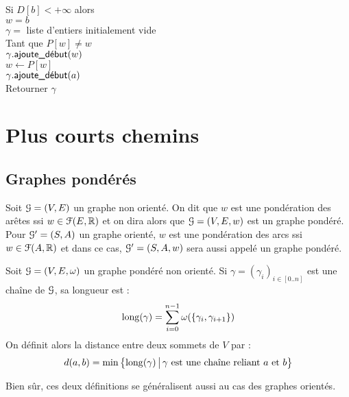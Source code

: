 			\begin{algocont}
				Si \(D[b] < +\infty\) alors \\ \Indp
					\(w = b\) \\
					\(\gamma = \) liste d'entiers initialement vide \\
					Tant que \(P[w] \neq w\)  \\ \Indp
						\(\gamma.\text{\textsf{ajoute\_début}}(w)\) \\
						\(w \gets P[w]\) \\ \Indm
					\(\gamma.\text{\textsf{ajoute\_début}}(a)\) \\ \Indm
				Retourner \(\gamma\)
			\end{algocont}
			

\section{Plus courts chemins}
	
	\subsection{Graphes pondérés}
	
		\begin{Definition}[pondération]
			Soit \(\EuScript{G} = (V,E)\) un graphe non orienté. On dit que \(w\) est une pondération des arêtes ssi \(w \in \EuScript{F}(E,\mathbb{R})\) et on dira alors que \(\EuScript{G} = (V,E,w)\) est un graphe pondéré. \nt
			Pour \(\EuScript{G}' = (S,A)\) un graphe orienté, \(w\) est une pondération des arcs ssi \(w\in\EuScript{F}(A,\mathbb{R})\) et dans ce cas, \(\EuScript{G}' = (S,A,w)\) sera aussi appelé un graphe pondéré.
		\end{Definition}
	
		\begin{Definition}
			Soit \(\EuScript{G} = (V,E,\omega)\) un graphe pondéré non orienté. \nt
			Si \(\gamma = (\gamma_i)_{i\in[0..n]}\) est une chaîne de \(\EuScript{G}\), sa longueur est :
				\[
					\operatorname{long}(\gamma) = \sum_{i=0}^{n-1} \omega(\{\gamma_i,\gamma_{i+1}\})
				\]
			On définit alors la distance entre deux sommets de \(V\) par :
				\[
					d(a,b) = \min\left\{\operatorname{long}(\gamma)\,\middle|\,\gamma \text{ est une chaîne reliant \(a\) et \(b\)}\right\}
				\]
		\end{Definition}
		
		\begin{Remarque}
			Bien sûr, ces deux définitions se généralisent aussi au cas des graphes orientés.
		\end{Remarque}
	
